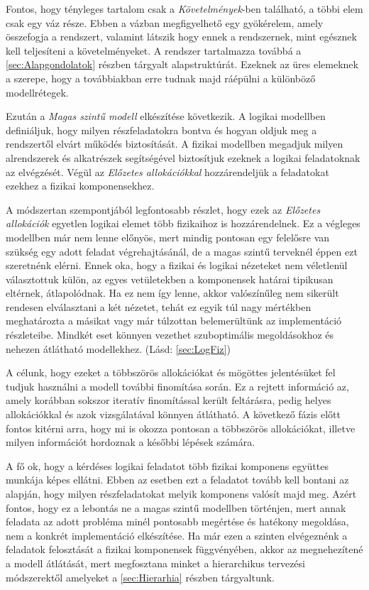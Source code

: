         Fontos, hogy tényleges tartalom csak a \emph{Követelmények}-ben található, a többi elem csak egy váz része. Ebben a vázban megfigyelhető egy gyökérelem, amely összefogja a rendszert, valamint látszik hogy ennek a rendszernek, mint egésznek kell teljesíteni a követelményeket.
        A rendszer tartalmazza továbbá a \ref{sec:Alapgondolatok} részben tárgyalt alapstruktúrát.
        Ezeknek az üres elemeknek a szerepe, hogy a továbbiakban erre tudnak majd ráépülni a különböző modellrétegek.

        Ezután a \emph{Magas szintű modell} elkészítése következik. A logikai modellben definiáljuk, hogy milyen részfeladatokra bontva és hogyan oldjuk meg a rendszertől elvárt működés biztosítását.
        A fizikai modellben megadjuk milyen alrendszerek és alkatrészek segítségével biztosítjuk ezeknek a logikai feladatoknak az elvégzését.
        Végül az \emph{Előzetes allokációkkal} hozzárendeljük a feladatokat ezekhez a fizikai komponensekhez.
        
        A módszertan szempontjából legfontosabb részlet, hogy ezek az \emph{Előzetes allokációk} egyetlen logikai elemet több fizikaihoz is hozzárendelnek. Ez a végleges modellben már nem lenne előnyös, mert mindig pontosan egy felelősre van szükség egy adott feladat végrehajtásánál, de a magas szintű terveknél éppen ezt szeretnénk elérni.
        Ennek oka, hogy a fizikai és logikai nézeteket nem véletlenül választottuk külön, az egyes vetületekben a komponensek határai tipikusan eltérnek, átlapolódnak.
        Ha ez nem így lenne, akkor valószínűleg nem sikerült rendesen elválasztani a két nézetet, tehát ez egyik túl nagy mértékben meghatározta a másikat vagy már túlzottan belemerültünk az implementáció részleteibe. Mindkét eset könnyen vezethet szuboptimális megoldásokhoz és nehezen átlátható modellekhez. (Lásd: \ref{sec:LogFiz})
        
        A célunk, hogy ezeket a többszörös allokációkat és mögöttes jelentésüket fel tudjuk használni a modell további finomítása során. Ez a rejtett információ az, amely korábban sokszor iteratív finomítással került feltárásra, pedig helyes allokációkkal és azok vizsgálatával könnyen átlátható.
        A következő fázis előtt fontos kitérni arra, hogy mi is okozza pontosan a többszörös allokációkat, illetve milyen információt hordoznak a későbbi lépések számára.
        
        A fő ok, hogy a kérdéses logikai feladatot több fizikai komponens együttes munkája képes ellátni. Ebben az esetben ezt a feladatot tovább kell bontani az alapján, hogy milyen részfeladatokat melyik komponens valósít majd meg.
        Azért fontos, hogy ez a lebontás ne a magas szintű modellben történjen, mert annak feladata az adott probléma minél pontosabb megértése és hatékony megoldása, nem a konkrét implementáció elkészítése.
        Ha már ezen a szinten elvégeznénk a feladatok felosztását a fizikai komponensek függvényében, akkor az megnehezítené a modell átlátását, mert megfosztana minket a hierarchikus tervezési módszerektől amelyeket a \ref{sec:Hierarhia} részben tárgyaltunk.
        
